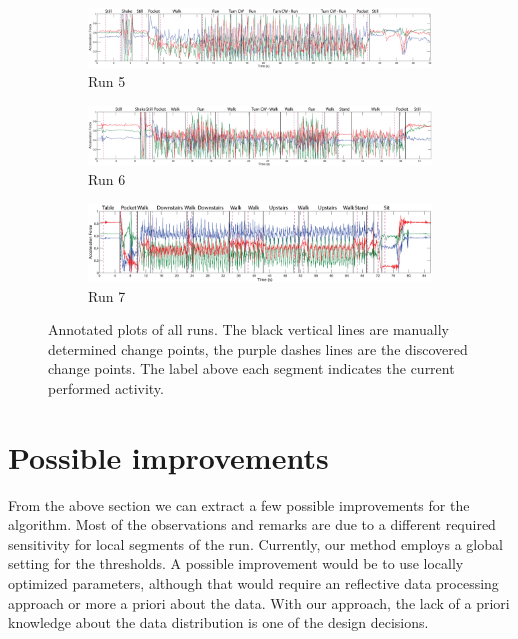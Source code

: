 \begin{figure}
  \begin{subfigure}{1\textwidth}
    \includegraphics[width=\textwidth]{./Figures/chapter6/data_collection/run-5-run-fountain-jos/data_plot_acc_with_discovered_cps.eps}
    \caption{Run 5}
    \label{fig:data_with_cps_run_5}
  \end{subfigure}

  \begin{subfigure}{1\textwidth}
    \includegraphics[width=\textwidth]{./Figures/chapter6/data_collection/run-6-walk-run-roemer/data_plot_acc_with_discovered_cps.eps}
    \caption{Run 6}
    \label{fig:data_with_cps_run_6}
  \end{subfigure}

  \begin{subfigure}{1\textwidth}
    \includegraphics[width=\textwidth]{./Figures/chapter6/data_collection/stairs-1-marc/data_plot_acc_with_discovered_cps.eps}
    \caption{Run 7}
    \label{fig:data_with_cps_run_7}
  \end{subfigure}

  \caption[Results run 1/8]{Annotated plots of all runs. The black vertical lines are manually determined change points, the purple dashes lines are the discovered change points. The label above each segment indicates the current performed activity.}\label{fig:plots_all_runs_results}
\end{figure}


\section{Possible improvements}\label{sec:possible_improvements}
From the above section we can extract a few possible improvements for the algorithm.
Most of the observations and remarks are due to a different required sensitivity for local segments of the run.
Currently, our method employs a global setting for the thresholds.
A possible improvement would be to use locally optimized parameters, although that would require an reflective data processing approach or more a priori about the data.
With our approach, the lack of a priori knowledge about the data distribution is one of the design decisions.

